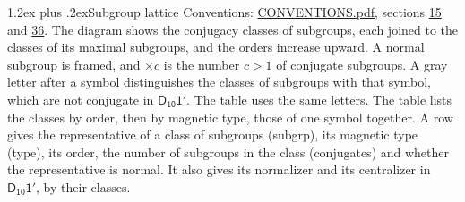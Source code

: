 \documentclass[10pt,a4paper]{article}
\makeatletter
\renewcommand\section{\@startsection{section}{1}{\z@}{-3ex plus -1ex minus -.2ex}%
  {1.2ex plus .2ex}{\normalfont\large\sffamily\bfseries\color{parttitle}}}
\numberwithin{equation}{section}
\newcommand{\grp}[1]{\mathsf{#1}}
\makeatother
\begin{document}
\section{Subgroup lattice}\label{s:subgroups}
Conventions: \href{../../CONVENTIONS.pdf}{CONVENTIONS.pdf}, sections \href{../../../rotation/CONVENTIONS.pdf\#conv.15}{15} and \href{../../CONVENTIONS.pdf\#conv.36}{36}.
The diagram shows the conjugacy classes of subgroups, each joined to the classes of its maximal subgroups, and the orders increase upward. \label{n:index.conjugates.c}\label{n:mark.conjugates}A normal subgroup is framed, and ${\times}c$ is the number $c > 1$ of conjugate subgroups. \label{n:mark.letter}A gray letter after a symbol distinguishes the classes of subgroups with that symbol, which are not conjugate in $\grp{D_{10}1'}$. The table uses the same letters. The table lists the classes by order, then by magnetic type, those of one symbol together. \label{n:head.subgroup}\label{n:head.magnetic.type}\label{n:head.order}\label{n:head.conjugates}\label{n:head.normal}A row gives the representative of a class of subgroups (subgrp), its magnetic type (type), its order, the number of subgroups in the class (conjugates) and whether the representative is normal. \label{n:head.normalizer}\label{n:head.centralizer}It also gives its normalizer and its centralizer in $\grp{D_{10}1'}$, by their classes. 
\end{document}
